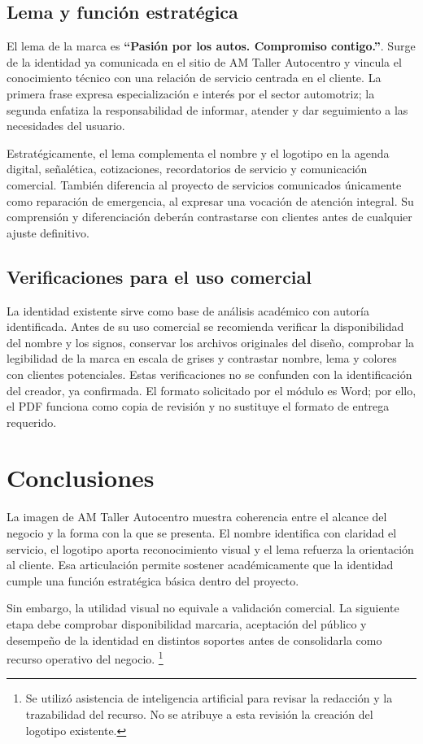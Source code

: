 {\subsection{Lema y función estratégica}

El lema de la marca es \textbf{``Pasión por los autos. Compromiso contigo.''}. Surge de la identidad ya comunicada en el sitio de AM Taller Autocentro y vincula el conocimiento técnico con una relación de servicio centrada en el cliente. La primera frase expresa especialización e interés por el sector automotriz; la segunda enfatiza la responsabilidad de informar, atender y dar seguimiento a las necesidades del usuario.

Estratégicamente, el lema complementa el nombre y el logotipo en la agenda digital, señalética, cotizaciones, recordatorios de servicio y comunicación comercial. También diferencia al proyecto de servicios comunicados únicamente como reparación de emergencia, al expresar una vocación de atención integral. Su comprensión y diferenciación deberán contrastarse con clientes antes de cualquier ajuste definitivo.

\subsection{Verificaciones para el uso comercial}

La identidad existente sirve como base de análisis académico con autoría identificada. Antes de su uso comercial se recomienda verificar la disponibilidad del nombre y los signos, conservar los archivos originales del diseño, comprobar la legibilidad de la marca en escala de grises y contrastar nombre, lema y colores con clientes potenciales. Estas verificaciones no se confunden con la identificación del creador, ya confirmada. El formato solicitado por el módulo es Word; por ello, el PDF funciona como copia de revisión y no sustituye el formato de entrega requerido.

\section{Conclusiones}

La imagen de AM Taller Autocentro muestra coherencia entre el alcance del negocio y la forma con la que se presenta. El nombre identifica con claridad el servicio, el logotipo aporta reconocimiento visual y el lema refuerza la orientación al cliente. Esa articulación permite sostener académicamente que la identidad cumple una función estratégica básica dentro del proyecto.

Sin embargo, la utilidad visual no equivale a validación comercial. La siguiente etapa debe comprobar disponibilidad marcaria, aceptación del público y desempeño de la identidad en distintos soportes antes de consolidarla como recurso operativo del negocio.
\footnote{Se utilizó asistencia de inteligencia artificial para revisar la redacción y la trazabilidad del recurso. No se atribuye a esta revisión la creación del logotipo existente.}
}
